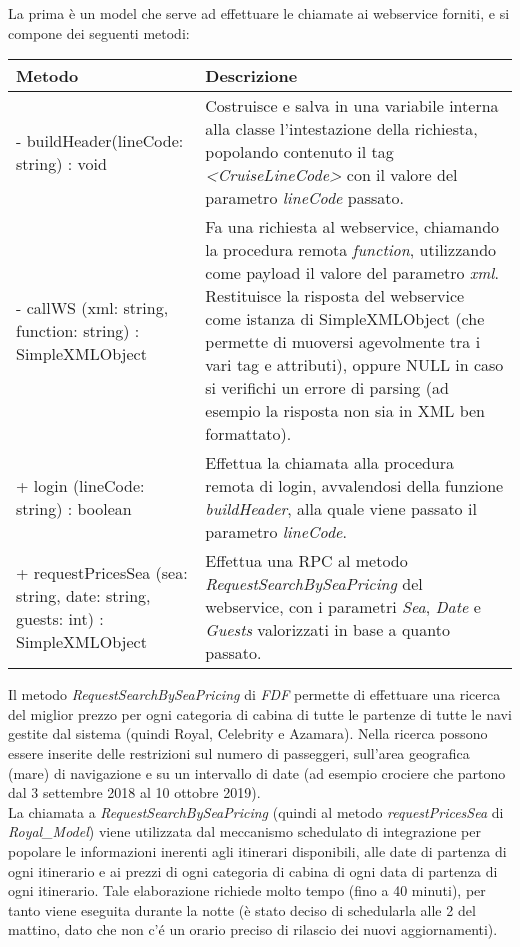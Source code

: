 La prima è un model che serve ad effettuare le chiamate ai \gls{webservice} forniti, e si compone dei seguenti metodi:
\begin{center}
	\def\arraystretch{1.5}
	\begin{longtable}{ >{\raggedright}p{5.5cm} p{6.8cm}} 
		\hline
		\textbf{Metodo} & \textbf{Descrizione} \\
		\hline
		- buildHeader(lineCode: string) : void & Costruisce e salva in una variabile interna alla classe l'intestazione della richiesta, popolando contenuto il tag \textit{<CruiseLineCode>} con il valore del parametro \textit{lineCode} passato.\\
		\hline
		- callWS (xml: string, function: string) : SimpleXMLObject & Fa una richiesta al \gls{webservice}, chiamando la procedura remota \textit{function}, utilizzando come payload il valore del parametro \textit{xml}. Restituisce la risposta del \gls{webservice} come istanza di SimpleXMLObject (che permette di muoversi agevolmente tra i vari tag e attributi), oppure NULL in caso si verifichi un errore di parsing (ad esempio la risposta non sia in XML ben formattato).\\
		\hline
		+ login (lineCode: string) : boolean & Effettua la chiamata alla procedura remota di login, avvalendosi della funzione \textit{buildHeader}, alla quale viene passato il parametro \textit{lineCode}.\\
		\hline
		+ requestPricesSea (sea: string, date: string, guests: int) : SimpleXMLObject & Effettua una \gls{RPC} al metodo \textit{RequestSearchBySeaPricing} del \gls{webservice}, con i parametri \textit{Sea}, \textit{Date} e \textit{Guests} valorizzati in base a quanto passato.\\
		\hline
	\end{longtable}
\end{center}
Il metodo \textit{RequestSearchBySeaPricing} di \textit{FDF} permette di effettuare una ricerca del miglior prezzo per ogni categoria di cabina di tutte le partenze di tutte le navi gestite dal sistema (quindi Royal, Celebrity e Azamara). Nella ricerca possono essere inserite delle restrizioni sul numero di passeggeri, sull'area geografica (mare) di navigazione e su un intervallo di date (ad esempio crociere che partono dal 3 settembre 2018 al 10 ottobre 2019). \\
La chiamata a \textit{RequestSearchBySeaPricing} (quindi al metodo \textit{requestPricesSea} di \textit{Royal\_Model}) viene utilizzata dal meccanismo schedulato di integrazione per popolare le informazioni inerenti agli itinerari disponibili, alle date di partenza di ogni itinerario e ai prezzi di ogni categoria di cabina di ogni data di partenza di ogni itinerario. Tale elaborazione richiede molto tempo (fino a 40 minuti), per tanto viene eseguita durante la notte (è stato deciso di schedularla alle 2 del mattino, dato che non c'é un orario preciso di rilascio dei nuovi aggiornamenti). \\
